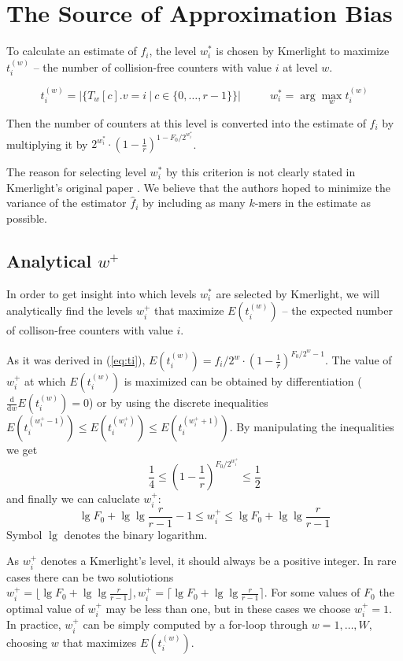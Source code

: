 \section{The Source of Approximation Bias}
\label{sec:source-of-bias}

To calculate an estimate of $f_i$, the level $w_i^*$ is chosen by Kmerlight
to maximize $t_i^{(w)}$ -- the number of collision-free counters with value $i$ at level $w$.

$$t_i^{(w)} = |\{T_w[c].v = i ~|~ c \in \{0, \dots, r-1\}\}| 
~~~~~~~~~~~~ w_i^* = \arg\max_w t_i^{(w)}$$

Then the number of counters at this level is converted into the estimate of
$f_i$ by multiplying it by $2^{w^*_i} \cdot \left(1 - \frac{1}{r}\right)^{1 - F_0/2^{w^*_i}}$. 

The reason for selecting level $w_i^*$ by this criterion 
is not clearly stated in Kmerlight's original paper \cite{Sivadasan2016}. 
We believe that the authors hoped to minimize the variance of the estimator $\hat f_i$
by including as many $k$-mers in the estimate as possible.

\subsection{Analytical $w^+$}
\label{sec:analytical-w}
In order to get insight into which levels $w_i^*$ are selected by Kmerlight, 
we will analytically find the levels $w_i^+$ that maximize $E(t_i^{(w)})$ -- the expected number 
of collison-free counters with value $i$.

As it was derived in (\ref{eq:ti}), 
$E(t_i^{(w)}) = f_i / 2^w \cdot \left(1 - \frac{1}{r}\right)^{F_0/2^w - 1}$.
The value of $w_i^+$ at which $E(t_i^{(w)})$ is maximized can be obtained by differentiation 
($\frac{\mathrm{d}}{\mathrm{d}w}E(t_i^{(w)}) = 0$) or by using the discrete inequalities 
$E(t_i^{(w^+_i-1)}) \leq E(t_i^{(w^+_i)}) \leq E(t_i^{(w^+_i+1)})$. 
By manipulating the inequalities we get
\begin{equation} \label{eq:wplusbounds}
\frac{1}{4} \leq \left(1 - \frac{1}{r}\right)^{F_0/2^{w^+_i}} \leq \frac{1}{2}
\end{equation}
and finally we can caluclate $w_i^+$:
$$\lg F_0 + \lg\lg \frac{r}{r-1}-1 \leq w_i^+ \leq \lg F_0 + \lg\lg \frac{r}{r-1}$$
Symbol $\lg$ denotes the binary logarithm. 

As $w_i^+$ denotes a Kmerlight's level, it should always be a positive integer.
In rare cases there can be two solutiotions $w_i^+ = \lfloor \lg F_0 + \lg\lg \frac{r}{r-1} \rfloor,
w_i^+ = \lceil \lg F_0 + \lg\lg \frac{r}{r-1} \rceil$. For some values of $F_0$ the optimal 
value of $w_i^+$ may be less than one, but in these cases we choose $w_i^+=1$. In practice,
$w^+_i$ can be simply computed by a for-loop through $w=1, \dots, W$, choosing $w$ that
maximizes $E(t_i^{(w)})$. 

